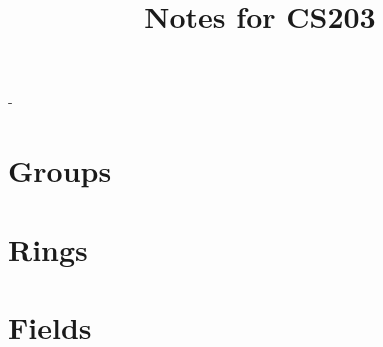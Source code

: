 \documentclass[a4paper,12pt]{memoir}
\title{Notes for CS203}
\author{}
\date{}
\begin{document}
\frontmatter
\begin{titlingpage}
  \calccentering{\unitlength}
  \begin{adjustwidth*}{\unitlength}{-\unitlength}
    \setlength{\droptitle}{30pt}
    \maketitle
  \end{adjustwidth*}

\end{titlingpage}
\tableofcontents
\mainmatter
\chapter{Groups}

\chapter{Rings}

\chapter{Fields}

\end{document}
